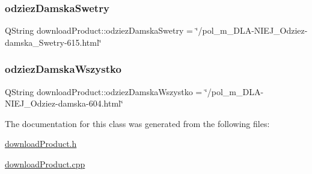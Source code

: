 \mbox{\label{classdownload_product_a8ba9fa034caea2d860991d1ea4e19c7c}} 
\subsubsection{\texorpdfstring{odziez\+Damska\+Swetry}{odziezDamskaSwetry}}
{\footnotesize\ttfamily Q\+String download\+Product\+::odziez\+Damska\+Swetry = \char`\"{}/pol\+\_\+m\+\_\+\+D\+LA-\/N\+I\+E\+J\+\_\+\+Odziez-\/damska\+\_\+\+Swetry-\/615.html\char`\"{}\hspace{0.3cm}{\ttfamily [private]}}

\mbox{\label{classdownload_product_af044eff03d0253442f16919758e3b9d8}} 
\subsubsection{\texorpdfstring{odziez\+Damska\+Wszystko}{odziezDamskaWszystko}}
{\footnotesize\ttfamily Q\+String download\+Product\+::odziez\+Damska\+Wszystko = \char`\"{}/pol\+\_\+m\+\_\+\+D\+LA-\/N\+I\+E\+J\+\_\+\+Odziez-\/damska-\/604.html\char`\"{}\hspace{0.3cm}{\ttfamily [private]}}



The documentation for this class was generated from the following files\+:\begin{DoxyCompactItemize}
\item 
\mbox{\hyperlink{download_product_8h}{download\+Product.\+h}}\item 
\mbox{\hyperlink{download_product_8cpp}{download\+Product.\+cpp}}\end{DoxyCompactItemize}
